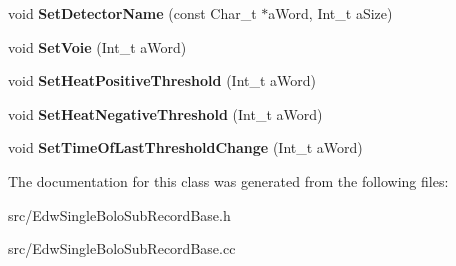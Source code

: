 \begin{DoxyCompactItemize}
\item 
\hypertarget{class_edw_single_bolo_sub_record_base_a576d97758367d0020c1ac7597d59c884}{
void {\bfseries SetDetectorName} (const Char\_\-t $\ast$aWord, Int\_\-t aSize)}
\label{class_edw_single_bolo_sub_record_base_a576d97758367d0020c1ac7597d59c884}

\item 
\hypertarget{class_edw_single_bolo_sub_record_base_a8b435d0699cf1c15fccf8df247808eeb}{
void {\bfseries SetVoie} (Int\_\-t aWord)}
\label{class_edw_single_bolo_sub_record_base_a8b435d0699cf1c15fccf8df247808eeb}

\item 
\hypertarget{class_edw_single_bolo_sub_record_base_a774e70ff866ac336bc0bed5fb679faf9}{
void {\bfseries SetHeatPositiveThreshold} (Int\_\-t aWord)}
\label{class_edw_single_bolo_sub_record_base_a774e70ff866ac336bc0bed5fb679faf9}

\item 
\hypertarget{class_edw_single_bolo_sub_record_base_aa0b2bd46451145b76e0931b571fc2017}{
void {\bfseries SetHeatNegativeThreshold} (Int\_\-t aWord)}
\label{class_edw_single_bolo_sub_record_base_aa0b2bd46451145b76e0931b571fc2017}

\item 
\hypertarget{class_edw_single_bolo_sub_record_base_ae4b8b9cc021568d2f0cf18077745f68e}{
void {\bfseries SetTimeOfLastThresholdChange} (Int\_\-t aWord)}
\label{class_edw_single_bolo_sub_record_base_ae4b8b9cc021568d2f0cf18077745f68e}

\end{DoxyCompactItemize}


The documentation for this class was generated from the following files:\begin{DoxyCompactItemize}
\item 
src/EdwSingleBoloSubRecordBase.h\item 
src/EdwSingleBoloSubRecordBase.cc\end{DoxyCompactItemize}
